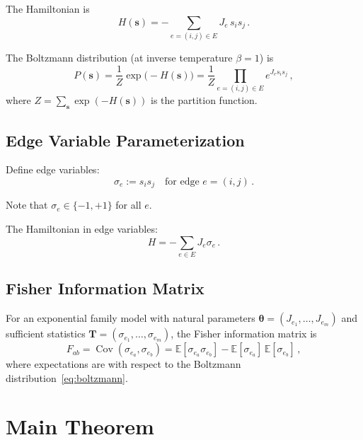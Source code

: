 \documentclass[11pt]{article}
\theoremstyle{definition}
\theoremstyle{remark}
\begin{document}
The Hamiltonian is
\begin{equation}
\label{eq:hamiltonian}
H(\mathbf{s}) = -\sum_{e=(i,j) \in E} J_e\, s_i s_j\,.
\end{equation}

The Boltzmann distribution (at inverse temperature $\beta = 1$) is
\begin{equation}
\label{eq:boltzmann}
P(\mathbf{s}) = \frac{1}{Z} \exp\bigl(-H(\mathbf{s})\bigr)
= \frac{1}{Z} \prod_{e=(i,j) \in E} e^{J_e s_i s_j}\,,
\end{equation}
where $Z = \sum_{\mathbf{s}} \exp(-H(\mathbf{s}))$ is the partition function.

\subsection{Edge Variable Parameterization}

Define edge variables:
\begin{equation}
\label{eq:edge-variables}
\sigma_e := s_i s_j \quad \text{for edge } e = (i,j)\,.
\end{equation}

Note that $\sigma_e \in \{-1, +1\}$ for all $e$.

The Hamiltonian in edge variables:
\begin{equation}
\label{eq:hamiltonian-edge}
H = -\sum_{e \in E} J_e \sigma_e\,.
\end{equation}

\subsection{Fisher Information Matrix}

For an exponential family model with natural parameters $\boldsymbol{\theta} = (J_{e_1}, \ldots, J_{e_m})$ and sufficient statistics $\mathbf{T} = (\sigma_{e_1}, \ldots, \sigma_{e_m})$, the Fisher information matrix is
\begin{equation}
\label{eq:fisher-definition}
F_{ab} = \operatorname{Cov}(\sigma_{e_a}, \sigma_{e_b})
= \mathbb{E}[\sigma_{e_a} \sigma_{e_b}] - \mathbb{E}[\sigma_{e_a}]\,\mathbb{E}[\sigma_{e_b}]\,,
\end{equation}
where expectations are with respect to the Boltzmann distribution~\eqref{eq:boltzmann}.

\section{Main Theorem}
\end{document}

